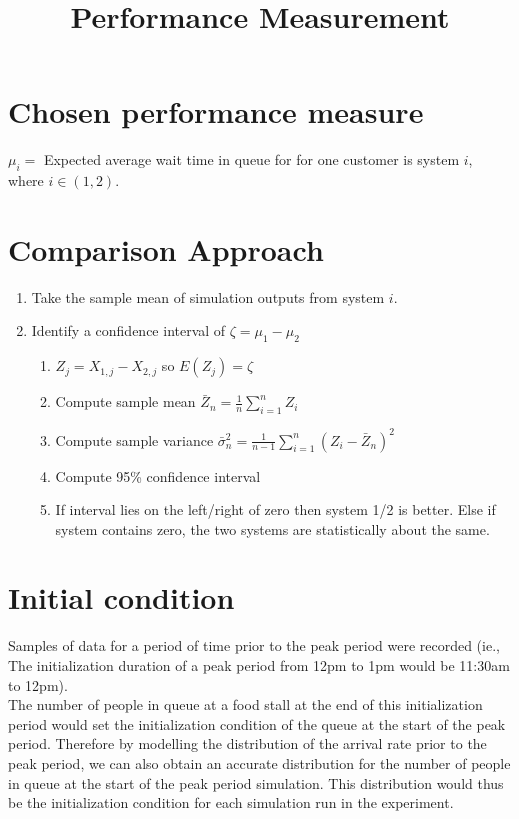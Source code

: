 \documentclass{article}
\begin{document}
\pagecolor{ultramarine}
\title{Performance Measurement}
\author{}
\date{}
\maketitle
\section{Chosen performance measure}
$\mu_i=$ Expected average wait time in queue for for one customer is system $i$, where $i \in (1,2)$. 
\section{Comparison Approach}
\begin{enumerate}
\item Take the sample mean of simulation outputs from system $i$.
\item Identify a confidence interval of $\zeta=\mu_1-\mu_2$ \begin{enumerate}
\item $Z_j=X_{1,j}-X_{2,j}$ so $E(Z_j)=\zeta$
\item Compute sample mean $\bar Z_n = \frac{1}{n}\sum_{i=1}^n Z_i$
\item Compute sample variance $\bar{\sigma}_n^2=\frac{1}{n-1}\sum_{i=1}^n(Z_i-\bar Z_n)^2$
\item Compute 95\% confidence interval
\item If interval lies on the left/right of zero then system 1/2 is better. Else if system contains zero, the two systems are statistically about the same.
\end{enumerate}
\end{enumerate}
\section{Initial condition}
Samples of data for a period of time prior to the peak period were recorded (ie., The initialization duration of a peak period from 12pm to 1pm would be 11:30am to 12pm).\\ The number of people in queue at a food stall at the end of this initialization period would set the initialization condition of the queue at the start of the peak period. Therefore by modelling the distribution of the arrival rate prior to the peak period, we can also obtain an accurate distribution for the number of people in queue at the start of the peak period simulation. This distribution would thus be the initialization condition for each simulation run in the experiment.
\end{document}
